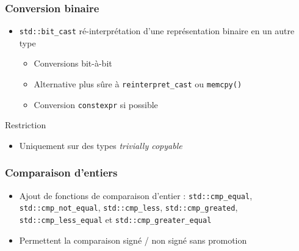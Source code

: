 \documentclass[C++.tex]{subfiles}
\begin{document}
\begin{frame}[fragile]
	\frametitle{Conversion binaire}
	\begin{itemize}
		\item \lstinline|std::bit_cast| ré-interprétation d'une représentation binaire en un autre type
		\begin{itemize}
			\item Conversions bit-à-bit
			\item Alternative plus sûre à \lstinline|reinterpret_cast| ou \lstinline|memcpy()|
			\item Conversion \lstinline|constexpr| si possible
		\end{itemize}
	\end{itemize}

	\begin{alertblock}{Restriction}
		\begin{itemize}
			\item Uniquement sur des types \textit{trivially copyable}
		\end{itemize}
	\end{alertblock}
\end{frame}

\begin{frame}[fragile]
	\frametitle{Comparaison d'entiers}
	\begin{itemize}
		\item Ajout de fonctions de comparaison d'entier : \lstinline|std::cmp_equal|, \lstinline|std::cmp_not_equal|, \lstinline|std::cmp_less|, \lstinline|std::cmp_greated|, \lstinline|std::cmp_less_equal| et \lstinline|std::cmp_greater_equal|
		\item Permettent la comparaison signé / non signé sans promotion
	\end{itemize}
\end{frame}
\end{document}
